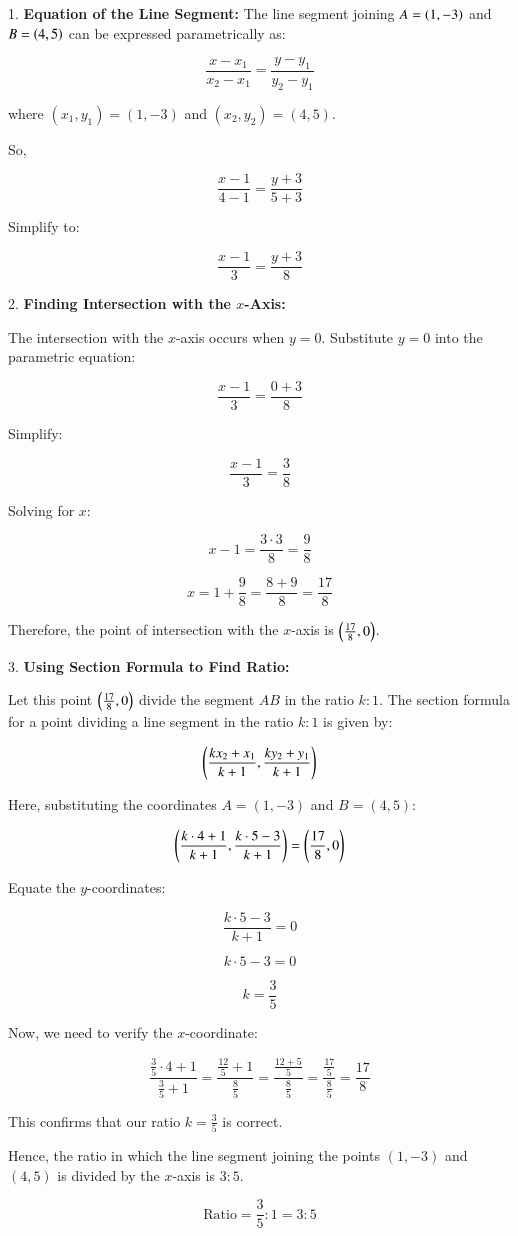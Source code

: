 \documentclass[journal]{IEEEtran}
\begin{document}
1. \textbf{Equation of the Line Segment:}
The line segment joining $A=\left(1,-3\right)$ and $B=\left(4,5\right)$ can be expressed parametrically as:

   $$\frac{x-x_1}{x_2-x_1}=\frac{y-y_1}{y_2-y_1}$$

   where $(x_1,y_1)=(1,-3)$ and $(x_2,y_2)=(4,5)$.

   So,

   $$\frac{x-1}{4-1}=\frac{y+3}{5+3}$$

   Simplify to:

   $$\frac{x-1}{3}=\frac{y+3}{8}$$

2. \textbf{Finding Intersection with the \( x \)-Axis:}

   The intersection with the $x$-axis occurs when $y=0$. Substitute $y=0$ into the parametric equation:

   $$\frac{x-1}{3}=\frac{0+3}{8}$$

   Simplify:

   $$\frac{x-1}{3}=\frac{3}{8}$$

   Solving for $x$:

   $$x-1=\frac{3 \cdot 3}{8}=\frac{9}{8}$$

   $$x=1+\frac{9}{8}=\frac{8+9}{8}=\frac{17}{8}$$

   Therefore, the point of intersection with the $x$-axis is $\left(\frac{17}{8}, 0\right)$.

3. \textbf{Using Section Formula to Find Ratio:}

   Let this point $\left(\frac{17}{8},0\right)$ divide the segment $AB$ in the ratio $k:1$. The section formula for a point dividing a line segment in the ratio $k:1$ is given by:

   $$\left(\frac{kx_2+x_1}{k+1},\frac{ky_2+y_1}{k+1}\right)$$

   Here, substituting the coordinates $A=(1,-3)$ and $B=(4,5)$:

   $$\left(\frac{k \cdot 4+1}{k+1},\frac{k \cdot 5-3}{k+1}\right)=\left(\frac{17}{8},0\right)$$

   Equate the $y$-coordinates:

   $$\frac{k \cdot 5-3}{k+1}=0$$

   $$k \cdot 5-3=0$$

   $$k=\frac{3}{5}$$

   Now, we need to verify the $x$-coordinate:

   $$\frac{\frac{3}{5} \cdot 4 + 1}{\frac{3}{5} + 1} = \frac{\frac{12}{5} + 1}{\frac{8}{5}} = \frac{\frac{12 + 5}{5}}{\frac{8}{5}} = \frac{\frac{17}{5}}{\frac{8}{5}} = \frac{17}{8}$$

   This confirms that our ratio $k=\frac{3}{5}$ is correct.

   Hence, the ratio in which the line segment joining the points $(1,-3)$ and $(4,5)$ is divided by the $x$-axis is $3:5$.

   $$\text{Ratio}=\frac{3}{5}:1=3:5$$
\end{document}
